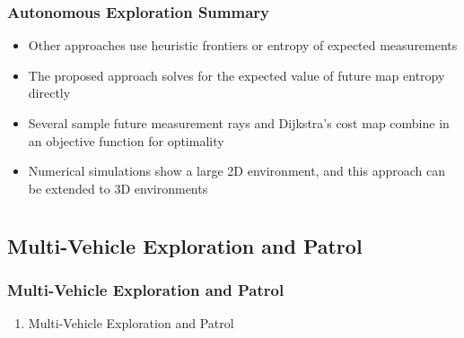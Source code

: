 \documentclass[11pt,professionalfonts,hyperref={pdftex,pdfpagemode=none,pdfstartview=FitH}]{beamer}
\begin{document}
\begin{frame}
\frametitle{Autonomous Exploration Summary}

\begin{itemize}
	\item Other approaches use heuristic frontiers or entropy of expected measurements
	\item The proposed approach solves for the expected value of future map entropy directly
	\item Several sample future measurement rays and Dijkstra's cost map combine in an objective function for optimality
	\item Numerical simulations show a large 2D environment, and this approach can be extended to 3D environments
\end{itemize}

\end{frame}

\section*{}
\subsection*{Multi-Vehicle Exploration and Patrol}

\begin{frame}
\frametitle{Multi-Vehicle Exploration and Patrol}
\begin{enumerate}[I]
\addtocounter{enumi}{2}
	\item Multi-Vehicle Exploration and Patrol
\end{enumerate}
\end{frame}
\end{document}
